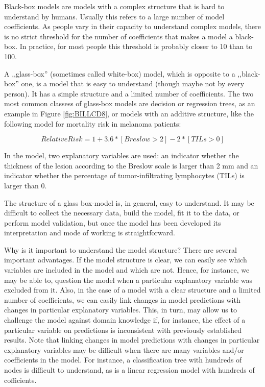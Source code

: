 \documentclass[12pt,]{krantz}
\begin{document}
Black-box models are models with a complex structure that is hard to understand by humans. Usually this refers to a large number of model coefficients. As people vary in their capacity to understand complex models, there is no strict threshold for the number of coefficients that makes a model a black-box. In practice, for most people this threshold is probably closer to 10 than to 100.

A ,,glass-box'' (sometimes called white-box) model, which is opposite to a ,,black-box'' one, is a model that is easy to understand (though maybe not by every person). It has a simple structure and a limited number of coefficients. The two most common classess of glass-box models are decision or regression trees, as an example in Figure \ref{fig:BILLCD8}, or models with an additive structure, like the following model for mortality risk in melanoma patients:

\[
RelativeRisk = 1 + 3.6 * [Breslow > 2] - 2 * [TILs > 0] 
\]

In the model, two explanatory variables are used: an indicator whether the thickness of the lesion according to the Breslow scale is larger than 2 mm and an indicator whether the percentage of tumor-infiltrating lymphocytes (TILs) is larger than 0.

The structure of a glass box-model is, in general, easy to understand. It may be difficult to collect the necessary data, build the model, fit it to the data, or perform model validation, but once the model has been developed its interpretation and mode of working is straightforward.

Why is it important to understand the model structure? There are several important advantages. If the model structure is clear, we can easily see which variables are included in the model and which are not. Hence, for instance, we may be able to, question the model when a particular explanatory variable was excluded from it. Also, in the case of a model with a clear structure and a limited number of coefficients, we can easily link changes in model predictions with changes in particular explanatory variables. This, in turn, may allow us to challenge the model against domain knowledge if, for instance, the effect of a particular variable on predictions is inconsistent with previously established results. Note that linking changes in model predictions with changes in particular explanatory variables may be difficult when there are many variables and/or coefficients in the model. For instance, a classification tree with hundreds of nodes is difficult to understand, as is a linear regression model with hundreds of cofficients.
\end{document}
